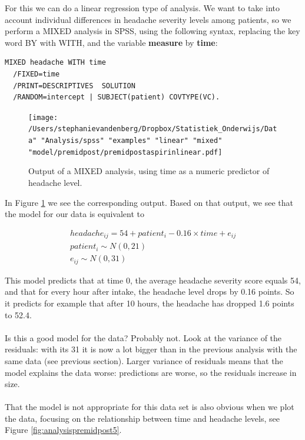 \documentclass[]{book}\usepackage[]{graphicx}\usepackage[]{color}
\begin{document}
For this we can do a linear regression type of analysis. We want to take into account individual differences in headache severity levels among patients, so we perform a MIXED analysis in SPSS, using the following syntax, replacing the key word BY with WITH, and the variable \textbf{measure} by \textbf{time}:

\begin{verbatim}
MIXED headache WITH time
  /FIXED=time
  /PRINT=DESCRIPTIVES  SOLUTION
  /RANDOM=intercept | SUBJECT(patient) COVTYPE(VC).
\end{verbatim}




\begin{figure}[h]
\label{fig:premidpostaspirinlinear}
    \begin{center}
       \texttt{[image: /Users/stephanievandenberg/Dropbox/Statistiek\_Onderwijs/Data" "Analysis/spss" "examples" "linear" "mixed" "model/premidpost/premidpostaspirinlinear.pdf]}
    \end{center}
    \caption{Output of a MIXED analysis, using time as a numeric predictor of headache level.}
\end{figure}


In Figure \ref{fig:premidpostaspirinlinear} we see the corresponding output. Based on that output, we see that the model for our data is equivalent to


\begin{eqnarray}
headache_{ij} = 54 + patient_i - 0.16 \times time + e_{ij} \\
patient_i \sim N(0, 21)\\
e_{ij} \sim N(0, 31)
\end{eqnarray}

This model predicts that at time 0, the average headache severity score equals 54, and that for every hour after intake, the headache level drops by 0.16 points. So it predicts for example that after 10 hours, the headache has dropped 1.6 points to 52.4. 
\\
\\
Is this a good model for the data? Probably not. Look at the variance of the residuals: with its 31 it is now a lot bigger than in the previous analysis with the same data (see previous section). Larger variance of residuals means that the model explains the data worse: predictions are worse, so the residuals increase in size. 
\\
\\
That the model is not appropriate for this data set is also obvious when we plot the data, focusing on the relationship between time and headache levels, see Figure \ref{fig:analysispremidpost5}. 
\end{document}
